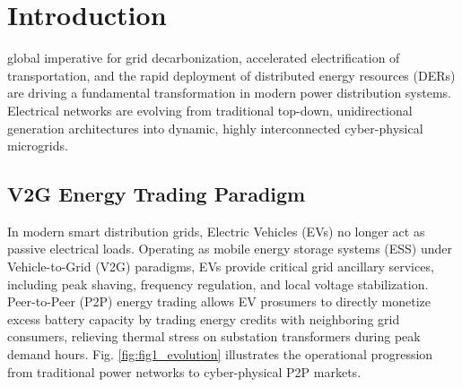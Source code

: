\documentclass[10pt,twocolumn,journal]{IEEEtran}
\begin{document}
\section{Introduction}
\label{sec:introduction}
 global imperative for grid decarbonization, accelerated electrification of transportation, and the rapid deployment of distributed energy resources (DERs) are driving a fundamental transformation in modern power distribution systems. Electrical networks are evolving from traditional top-down, unidirectional generation architectures into dynamic, highly interconnected cyber-physical microgrids.

\subsection{V2G Energy Trading Paradigm}
In modern smart distribution grids, Electric Vehicles (EVs) no longer act as passive electrical loads. Operating as mobile energy storage systems (ESS) under Vehicle-to-Grid (V2G) paradigms, EVs provide critical grid ancillary services, including peak shaving, frequency regulation, and local voltage stabilization. Peer-to-Peer (P2P) energy trading allows EV prosumers to directly monetize excess battery capacity by trading energy credits with neighboring grid consumers, relieving thermal stress on substation transformers during peak demand hours. Fig. \ref{fig:fig1_evolution} illustrates the operational progression from traditional power networks to cyber-physical P2P markets.
\end{document}
